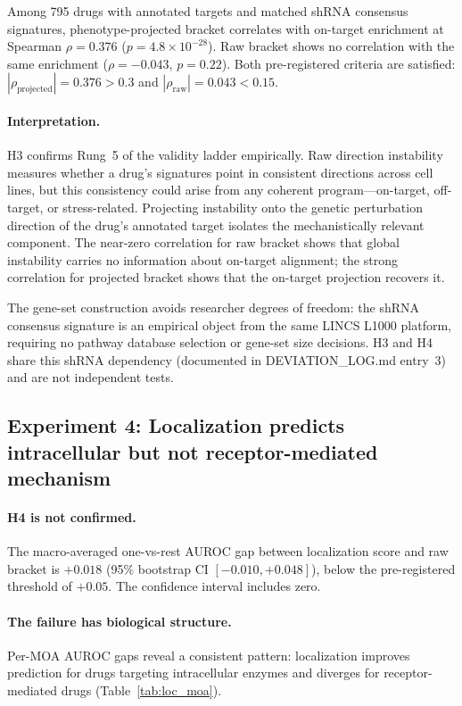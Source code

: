 \documentclass{article}
\begin{document}
Among 795 drugs with annotated targets and matched shRNA consensus signatures,
phenotype-projected bracket correlates with on-target enrichment at Spearman
$\rho = 0.376$ ($p = 4.8 \times 10^{-28}$). Raw bracket shows no correlation
with the same enrichment ($\rho = -0.043$, $p = 0.22$). Both pre-registered
criteria are satisfied: $|\rho_{\text{projected}}| = 0.376 > 0.3$ and
$|\rho_{\text{raw}}| = 0.043 < 0.15$.

\paragraph{Interpretation.}
H3 confirms Rung~5 of the validity ladder empirically. Raw direction
instability measures whether a drug's signatures point in consistent
directions across cell lines, but this consistency could arise from any
coherent program---on-target, off-target, or stress-related. Projecting
instability onto the genetic perturbation direction of the drug's annotated
target isolates the mechanistically relevant component. The near-zero
correlation for raw bracket shows that global instability carries no
information about on-target alignment; the strong correlation for projected
bracket shows that the on-target projection recovers it.

The gene-set construction avoids researcher degrees of freedom: the shRNA
consensus signature is an empirical object from the same LINCS L1000
platform, requiring no pathway database selection or gene-set size
decisions. H3 and H4 share this shRNA dependency
(documented in DEVIATION\_LOG.md entry~3) and are not independent tests.

\subsection{Experiment 4: Localization predicts intracellular but not receptor-mediated mechanism}

\paragraph{H4 is not confirmed.}
The macro-averaged one-vs-rest AUROC gap between localization score and raw
bracket is $+0.018$ (95\% bootstrap CI $[-0.010, +0.048]$), below the
pre-registered threshold of $+0.05$. The confidence interval includes zero.

\paragraph{The failure has biological structure.}
Per-MOA AUROC gaps reveal a consistent pattern: localization improves
prediction for drugs targeting intracellular enzymes and diverges for
receptor-mediated drugs (Table~\ref{tab:loc_moa}).
\end{document}
